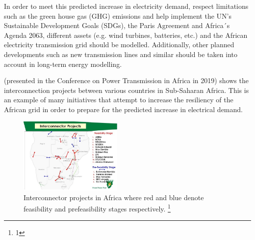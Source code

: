 \documentclass[conference, a4paper]{IEEEtran}
\begin{document}
In order to meet this predicted increase in electricity demand, respect limitations such as the green house gas (GHG) emissions and help implement the UN's Sustainable Development Goals (SDGs), the Paris Agreement and Africa´s Agenda 2063, different assets (e.g. wind turbines, batteries, etc.) and the African electricity transmission grid should be modelled. Additionally, other planned developments such as new transmission lines and similar should be taken into account in long-term energy modelling.

 (presented in the Conference on Power Transmission in Africa in 2019) shows the interconnection projects between various countries in Sub-Saharan Africa. This is an example of many initiatives that attempt to increase the resiliency of the African grid in order to prepare for the predicted increase in electrical demand.

\begin{figure}[t]
\centerline{\includegraphics[trim =  0.2cm 0cm 3cm 1.15cm, clip,width = 0.45\textwidth]{Figures/interconnector.jpg}}
\caption{Interconnector projects in Africa where red and blue denote feasibility and prefeasibility stages respectively. \footnote{1} }
\label{interconnector}
\end{figure}

\end{document}
